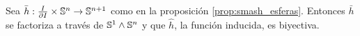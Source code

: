 
\begin{ejercicio}\label{ej:10}

Sea $\bar{h}:\frac{I}{\partial I}\times\mathbb{S}^n\rightarrow\mathbb{S}^{n+1}$ como en la proposici\'on \ref{prop:smash_esferas}.
Entonces $\bar{h}$ se factoriza a trav\'es de $\mathbb{S}^1\wedge\mathbb{S}^n$ y que $\hat{h}$, la funci\'on inducida,
es biyectiva.

\end{ejercicio}

